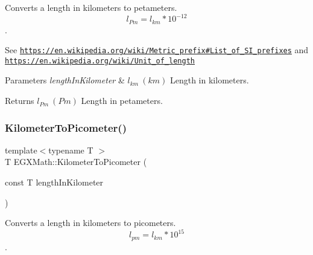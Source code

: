 Converts a length in kilometers to petameters. \[ l_{Pm}=l_{km} * 10^{-12} \]. 

See \href{https://en.wikipedia.org/wiki/Metric_prefix#List_of_SI_prefixes}{\tt https\+://en.\+wikipedia.\+org/wiki/\+Metric\+\_\+prefix\#\+List\+\_\+of\+\_\+\+S\+I\+\_\+prefixes} and \href{https://en.wikipedia.org/wiki/Unit_of_length}{\tt https\+://en.\+wikipedia.\+org/wiki/\+Unit\+\_\+of\+\_\+length} 
\begin{DoxyParams}{Parameters}
{\em length\+In\+Kilometer} & $ l_{km}\ (km)$ Length in kilometers. \\
\hline
\end{DoxyParams}
\begin{DoxyReturn}{Returns}
$ l_{Pm}\ (Pm)$ Length in petameters. 
\end{DoxyReturn}
\mbox{\label{group___e_g_x_math-_conversions-_length_conversions-_kilometer-_s_i_ga73f6e033de3c41892f06cde1862f68d6}} 
\subsubsection{\texorpdfstring{Kilometer\+To\+Picometer()}{KilometerToPicometer()}}
{\footnotesize\ttfamily template$<$typename T $>$ \\
T E\+G\+X\+Math\+::\+Kilometer\+To\+Picometer (\begin{DoxyParamCaption}\item[{const T}]{length\+In\+Kilometer }\end{DoxyParamCaption})}



Converts a length in kilometers to picometers. \[ l_{pm}=l_{km} * 10^{15} \]. 

